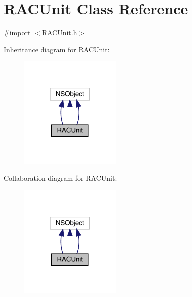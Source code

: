 \hypertarget{interface_r_a_c_unit}{}\section{R\+A\+C\+Unit Class Reference}
\label{interface_r_a_c_unit}


{\ttfamily \#import $<$R\+A\+C\+Unit.\+h$>$}



Inheritance diagram for R\+A\+C\+Unit\+:\nopagebreak
\begin{figure}[H]
\begin{center}
\leavevmode
\includegraphics[width=139pt]{interface_r_a_c_unit__inherit__graph}
\end{center}
\end{figure}


Collaboration diagram for R\+A\+C\+Unit\+:\nopagebreak
\begin{figure}[H]
\begin{center}
\leavevmode
\includegraphics[width=139pt]{interface_r_a_c_unit__coll__graph}
\end{center}
\end{figure}
